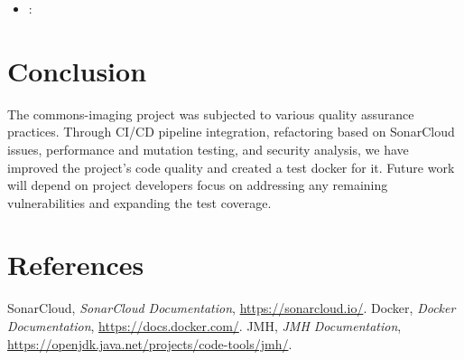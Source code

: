 \documentclass[a4paper,12pt]{report}
\begin{document}
\begin{itemize}
 \item \textbf{}:
\end{itemize}

\newpage

\chapter{Conclusion}
The commons-imaging project was subjected to various quality assurance practices. Through CI/CD pipeline integration, refactoring based on SonarCloud issues, performance and mutation testing, and security analysis, we have improved the project’s code quality and created a test docker for it. Future work will depend on project developers focus on addressing any remaining vulnerabilities and expanding the test coverage.

\newpage

\chapter{References}
\begin{thebibliography}{99}
     SonarCloud, \textit{SonarCloud Documentation}, \url{https://sonarcloud.io/}.
     Docker, \textit{Docker Documentation}, \url{https://docs.docker.com/}.
    \url{}
    \url{}
     JMH, \textit{JMH Documentation}, \url{https://openjdk.java.net/projects/code-tools/jmh/}.
    \url{}
    \url{}
\end{thebibliography}
\end{document}
